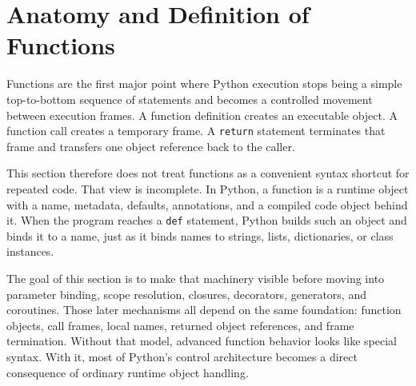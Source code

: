 \section{Anatomy and Definition of Functions}

Functions are the first major point where Python execution stops being a simple top-to-bottom sequence of statements and becomes a controlled movement between execution frames. A function definition creates an executable object. A function call creates a temporary frame. A \texttt{return} statement terminates that frame and transfers one object reference back to the caller.

This section therefore does not treat functions as a convenient syntax shortcut for repeated code. That view is incomplete. In Python, a function is a runtime object with a name, metadata, defaults, annotations, and a compiled code object behind it. When the program reaches a \texttt{def} statement, Python builds such an object and binds it to a name, just as it binds names to strings, lists, dictionaries, or class instances.

The goal of this section is to make that machinery visible before moving into parameter binding, scope resolution, closures, decorators, generators, and coroutines. Those later mechanisms all depend on the same foundation: function objects, call frames, local names, returned object references, and frame termination. Without that model, advanced function behavior looks like special syntax. With it, most of Python's control architecture becomes a direct consequence of ordinary runtime object handling.